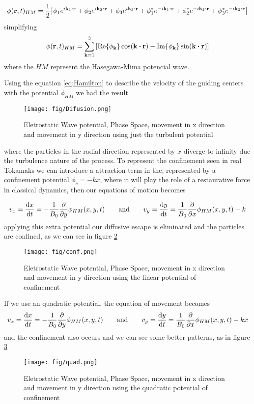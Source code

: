 \documentclass[12pt, a4paper]{article}
\begin{document}
\begin{equation}
	\phi(\vb{r},t)_{HM}=\frac{1}{2}\qty[\phi_1e^{i\vb{k}_1\vdot\vb{r}}+\phi_2e^{i\vb{k}_2\vdot\vb{r}}+\phi_3e^{i\vb{k}_3\vdot\vb{r}}+\phi_1^*e^{-i\vb{k}_1\vdot\vb{r}}+\phi_2^*e^{-i\vb{k}_2\vdot\vb{r}}+\phi_3^*e^{-i\vb{k}_3\vdot\vb{r}}]
\end{equation}
simplifying
\begin{equation}
	\phi(\vb{r},t)_{HM}=\sum_{\vb{k}=1}^{3}\qty[\Re{\phi_{\vb{k}}}\cos(\vb{k}\vdot\vb{r})-\Im{\phi_{\vb{k}}}\sin(\vb{k}\vdot\vb{r}) ]
\end{equation}
where the $HM$ represent the Hasegawa-Mima potencial wave. 

Using the equation \ref{eq:Hamilton} to describe the velocity of the guiding centers with the potential $\phi_{HM}$ we had the result

\begin{figure}[!h]
	\centering
	\texttt{[image: fig/Difusion.png]}
	\caption{Eletrostatic Wave potential, Phase Space, movement in x direction and movement in y direction using just the turbulent potential}
	\label{fig:difu}
\end{figure}

where the particles in the radial direction represented by $x$ diverge to infinity due the turbulence nature of the process. To represent the confinement seen in real Tokamaks we can introduce a attraction term in the, represented by a confinement potential $\phi_c=-kx$, where it will play the role of a restaurative force in classical dynamics, then our equations of motion becomes

\begin{equation}
	v_x = \dv{x}{t}=-\frac{1}{B_0}\pdv{y}\phi_{HM}(x,y,t)\qquad \text{and}\qquad v_y = \dv{y}{t}=\frac{1}{B_0}\pdv{x}\phi_{HM}(x,y,t)-k
\end{equation}
applying this extra potential our diffusive escape is eliminated and the particles are confined, as we can see in figure \ref{fig:conf}

\begin{figure}[!h]
	\centering
	\texttt{[image: fig/conf.png]}
	\caption{Eletrostatic Wave potential, Phase Space, movement in x direction and movement in y direction using the linear potential of confinement}
	\label{fig:conf}
\end{figure}

If we use an quadratic potential, the equation of movement becomes
\begin{equation}
	v_x = \dv{x}{t}=-\frac{1}{B_0}\pdv{y}\phi_{HM}(x,y,t)\qquad \text{and}\qquad v_y = \dv{y}{t}=\frac{1}{B_0}\pdv{x}\phi_{HM}(x,y,t)-kx
\end{equation}
and the confinement also occurs and we can see some better patterns, as in figure \ref{fig:conf2}

\begin{figure}[!h]
	\centering
	\texttt{[image: fig/quad.png]}
	\caption{Eletrostatic Wave potential, Phase Space, movement in x direction and movement in y direction using the quadratic potential of confinement}
	\label{fig:conf2}
\end{figure}
\end{document}
